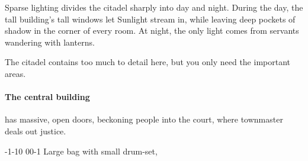 \begin{multicols}{2}
Sparse lighting divides the citadel sharply into day and night.
During the day, the tall building's tall windows let Sunlight stream in, while leaving deep pockets of shadow in the corner of every room.
At night, the only light comes from servants wandering with lanterns.

The citadel contains too much to detail here, but you only need the important areas.

\paragraph{The central building}
has massive, open doors, beckoning people into the \gls{court}, where \gls{townmaster} deals out justice.

\townmaster

%
  {{-1}{-1}{0}}%
  {{0}{0}{-1}}%
  {
  }%
  {}%
  {Large bag with small drum-set, \lootJewellery}%
  {}%


\end{multicols}
